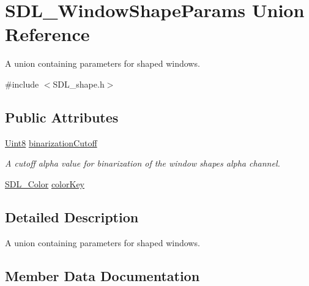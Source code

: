 \hypertarget{union_s_d_l___window_shape_params}{}\section{S\+D\+L\+\_\+\+Window\+Shape\+Params Union Reference}
\label{union_s_d_l___window_shape_params}


A union containing parameters for shaped windows.  




{\ttfamily \#include $<$S\+D\+L\+\_\+shape.\+h$>$}

\subsection*{Public Attributes}
\begin{DoxyCompactItemize}
\item 
\hyperlink{_s_d_l__stdinc_8h_a2944638813a090aa23e62f4da842c3e2}{Uint8} \hyperlink{union_s_d_l___window_shape_params_a534c40b09588a8075c0a70227753dc56}{binarization\+Cutoff}
\begin{DoxyCompactList}\small\item\em A cutoff alpha value for binarization of the window shape\textquotesingle{}s alpha channel. \end{DoxyCompactList}\item 
\hyperlink{struct_s_d_l___color}{S\+D\+L\+\_\+\+Color} \hyperlink{union_s_d_l___window_shape_params_a8bf3e442a51a1bbf452cfec7c1ed5318}{color\+Key}
\end{DoxyCompactItemize}


\subsection{Detailed Description}
A union containing parameters for shaped windows. 

\subsection{Member Data Documentation}
\mbox{\label{union_s_d_l___window_shape_params_a534c40b09588a8075c0a70227753dc56}} 
